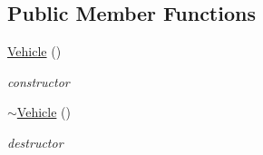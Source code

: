 \subsection*{Public Member Functions}
\begin{DoxyCompactItemize}
\item 
\hypertarget{classContent_1_1Actor_1_1Renderer_1_1Vehicle_a1d070de4c63a57a5510e9b7fdddf6c64}{
\hyperlink{classContent_1_1Actor_1_1Renderer_1_1Vehicle_a1d070de4c63a57a5510e9b7fdddf6c64}{Vehicle} ()}
\label{classContent_1_1Actor_1_1Renderer_1_1Vehicle_a1d070de4c63a57a5510e9b7fdddf6c64}

\begin{DoxyCompactList}\small\item\em constructor \item\end{DoxyCompactList}\item 
\hypertarget{classContent_1_1Actor_1_1Renderer_1_1Vehicle_acbe21400f8984a266d331cce581d19b3}{
\hyperlink{classContent_1_1Actor_1_1Renderer_1_1Vehicle_acbe21400f8984a266d331cce581d19b3}{$\sim$Vehicle} ()}
\label{classContent_1_1Actor_1_1Renderer_1_1Vehicle_acbe21400f8984a266d331cce581d19b3}

\begin{DoxyCompactList}\small\item\em destructor \item\end{DoxyCompactList}\end{DoxyCompactItemize}
